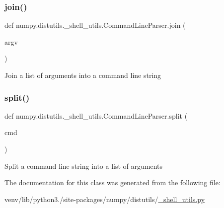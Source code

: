 \subsubsection{\texorpdfstring{join()}{join()}}
{\footnotesize\ttfamily def numpy.\+distutils.\+\_\+shell\+\_\+utils.\+Command\+Line\+Parser.\+join (\begin{DoxyParamCaption}\item[{}]{argv }\end{DoxyParamCaption})\hspace{0.3cm}{\ttfamily [static]}}

\begin{DoxyVerb}Join a list of arguments into a command line string \end{DoxyVerb}
 \mbox{\label{classnumpy_1_1distutils_1_1__shell__utils_1_1CommandLineParser_ae9b138499950f10a45e3a152bddfe781}} 
\subsubsection{\texorpdfstring{split()}{split()}}
{\footnotesize\ttfamily def numpy.\+distutils.\+\_\+shell\+\_\+utils.\+Command\+Line\+Parser.\+split (\begin{DoxyParamCaption}\item[{}]{cmd }\end{DoxyParamCaption})\hspace{0.3cm}{\ttfamily [static]}}

\begin{DoxyVerb}Split a command line string into a list of arguments \end{DoxyVerb}
 

The documentation for this class was generated from the following file\+:\begin{DoxyCompactItemize}
\item 
venv/lib/python3./site-\/packages/numpy/distutils/\hyperlink{__shell__utils_8py}{\+\_\+shell\+\_\+utils.\+py}\end{DoxyCompactItemize}
